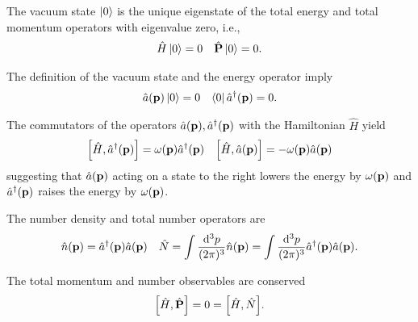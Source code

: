\begin{definition}
	The vacuum state $\ket{0}$ is the unique eigenstate of the total energy and total momentum operators with eigenvalue zero, i.e.,
	\begin{align}
		\hat{H}
		\ket{0}
		=
		0
		&&
		\hat{\vb{P}}
		\ket{0}
		=
		0
		.
	\end{align}
\end{definition}
\begin{corollary}
	The definition of the vacuum state and the energy operator imply
	\begin{align}
		\hat{a}(\vb{p})
		\ket{0}
		=
		0
		&&
		\bra{0}
		\hat{a}^\dagger(\vb{p})
		=
		0
		.
	\end{align}
\end{corollary}
\begin{theorem}
	The commutators of the operators $\hat{a}(\vb{p}),\hat{a}^\dagger(\vb{p})$ with the Hamiltonian $\hat{H}$ yield
	\begin{align}
		\comm{\hat{H}}{\hat{a}^\dagger(\vb{p})}
		=
		\omega(\vb{p})
		\hat{a}^\dagger(\vb{p})
		&&
		\comm{\hat{H}}{\hat{a}(\vb{p})}
		=
		-
		\omega(\vb{p})
		\hat{a}(\vb{p})
	\end{align}
	suggesting that $\hat{a}(\vb{p})$ acting on a state to the right lowers the energy by $\omega(\vb{p})$ and $\hat{a}^\dagger(\vb{p})$ raises the energy by $\omega(\vb{p})$.
\end{theorem}
\begin{definition}
	The number density and total number operators are
	\begin{align}
		\hat{n}(\vb{p})
		=
		\hat{a}^\dagger(\vb{p})
		\hat{a}(\vb{p})
		&&
		\hat{N}
		=
		\int\frac{\dd[3]{p}}{(2\pi)^3}
		\hat{n}(\vb{p})
		=
		\int\frac{\dd[3]{p}}{(2\pi)^3}
		\hat{a}^\dagger(\vb{p})
		\hat{a}(\vb{p})
		.
	\end{align}
\end{definition}
\begin{corollary}
	The total momentum and number observables are conserved
	\begin{equation}
		\comm{\hat{H}}{\hat{\vb{P}}}
		=
		0
		=
		\comm{\hat{H}}{\hat{N}}
		.
	\end{equation}
\end{corollary}

